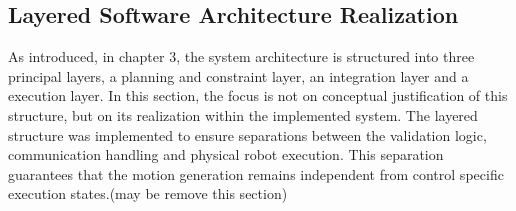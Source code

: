 \subsection{Layered Software Architecture Realization}
As introduced, in chapter 3, the system architecture is structured into three principal layers, a planning and constraint layer, an integration layer and a execution layer. In this section, the focus is not on conceptual justification of this structure, but on its realization within the implemented system. The layered structure was implemented to ensure separations between the validation logic, communication handling and physical robot execution. This separation guarantees that the motion generation remains independent from control specific execution states.(may be remove this section) %
